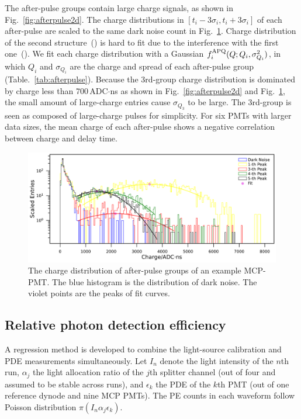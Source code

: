 The after-pulse groups contain large charge signals, as shown in Fig.~\ref{fig:afterpulse2d}. The charge distributions in $[t_i-3\sigma_i,t_i+3\sigma_i]$ of each after-pulse are scaled to the same dark noise count in Fig.~\ref{fig:afterpulsecharge}.  Charge distribution of the second structure~() is hard to fit due to the interference with the first one~().  We fit each charge distribution with a Gaussian $f^{\rm APQ}_i(Q;Q_i,\sigma_{Q_i}^2)$, in which $Q_i$ and $\sigma_{Q_i}$ are the charge and spread of each after-pulse group (Table.~\ref{tab:afterpulse}). Because the 3rd-group charge distribution is dominated by charge less than 700\,ADC$\cdot$ns as shown in Fig.~\ref{fig:afterpulse2d} and Fig.~\ref{fig:afterpulsecharge}, the small amount of large-charge entries cause $\sigma_{Q_3}$ to be large. The 3rd-group is seen as composed of large-charge pulses for simplicity.  For six PMTs with larger data sizes, the mean charge of each after-pulse shows a negative correlation between charge and delay time.

\begin{figure}[!htbp]
    \centering
    \includegraphics[width=\textwidth]{figures/method/triggerafterpulseCharge.pdf}
    \caption{The charge distribution of after-pulse groups of an example MCP-PMT. The blue histogram is the distribution of dark noise. The violet points are the peaks of fit curves.}
    \label{fig:afterpulsecharge}
\end{figure}

\subsection{Relative photon detection efficiency}
\label{sec:PDE}
A regression method is developed to combine the light-source calibration and PDE measurements simultaneously. Let $I_n$ denote the light intensity of the $n$th run, $\alpha_j$ the light allocation ratio of the $j$th splitter channel (out of four and assumed to be stable across runs), and $\epsilon_k$ the PDE of the $k$th PMT (out of one reference dynode and nine MCP PMTs). The PE counts in each waveform follow Poisson distribution $\pi(I_n\alpha_j\epsilon_k)$.

